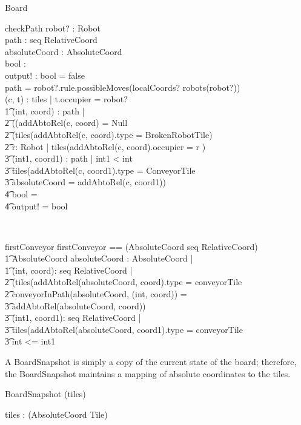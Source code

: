 \documentclass[12pt]{article}
\begin{document}
\begin{class}{Board}
\begin{schema}{checkPath}
robot? : Robot \\
path : seq RelativeCoord \\
absoluteCoord : AbsoluteCoord \\
bool : \bool \\
output! : \bool
\where
bool = false \\
path = robot?.rule.possibleMoves(localCoords? \cross robots(robot?)) \\
\exists (c, t) : tiles | t.occupier = robot? \implies \\ \t1
\forall (int, coord) : path | \\ \t2
((addAbtoRel(c, coord) = Null \vee \\ \t2
(tiles(addAbtoRel(c, coord).type = BrokenRobotTile) \vee \\ \t2
\exists r: Robot | tiles(addAbtoRel(c, coord).occupier = r )\implies \\ \t3
\exists (int1, coord1) : path | int1 < int \\ \t3
tiles(addAbtoRel(c, coord1).type = ConveyorTile \\ \t3
absoluteCoord = addAbtoRel(c, coord1)) \implies \\ \t4
bool = \true \\ \t4
output! = bool
\end{schema} \\
\begin{schema}{firstConveyor}
firstConveyor == (AbsoluteCoord \cross seq RelativeCoord) \fun \\ \t1 AbsoluteCoord
\where
\exists absoluteCoord : AbsoluteCoord |  \\ \t1
\exists (int, coord): seq RelativeCoord |  \\ \t2
(tiles(addAbtoRel(absoluteCoord, coord).type = conveyorTile \\ \t2
conveyorInPath(absoluteCoord, (int, coord)) = \\ \t3 addAbtoRel(absoluteCoord, coord)) \implies \\ \t3
\forall (int1, coord1): seq RelativeCoord | \\ \t3
\IF tiles(addAbtoRel(absoluteCoord, coord1).type = conveyorTile \\ \t3
\THEN int <= int1
\end{schema}
\end{class}

A BoardSnapshot is simply a copy of the current state of the board; therefore, the BoardSnapshot maintains a mapping of absolute coordinates to the tiles.
\begin{class}{BoardSnapshot}
\upharpoonright (tiles) \\
\begin{state}
tiles : \power (AbsoluteCoord \fun Tile) \\
\end{state}
\end{class}
\end{document}
